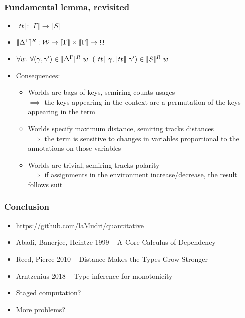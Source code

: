 \documentclass{beamer}
\begin{document}
  \begin{frame}
    \frametitle{Fundamental lemma, revisited}
    \begin{itemize}
    \item $\llbracket tt \rrbracket : \llbracket \Gamma \rrbracket \to
      \llbracket S \rrbracket$
    \item $\llbracket {\Delta}^{\Gamma} \rrbracket^R : \mathcal{W} \to
      \llbracket \Gamma \rrbracket \times \llbracket \Gamma \rrbracket \to \Omega$
    \item $\forall w.~\forall(\gamma, \gamma') \in \llbracket {\Delta}^{\Gamma}
      \rrbracket^R~w.~(\llbracket tt \rrbracket~\gamma, \llbracket tt
      \rrbracket~\gamma') \in \llbracket S \rrbracket^R~w$
    \item Consequences:
      \begin{itemize}
      \item Worlds are bags of keys, semiring counts usages \\
        $\implies$ the keys appearing in the context are a permutation of the
        keys appearing in the term
      \item Worlds specify maximum distance, semiring tracks distances \\
        $\implies$ the term is sensitive to changes in variables proportional to
        the annotations on those variables
      \item Worlds are trivial, semiring tracks polarity \\
        $\implies$ if assignments in the environment increase/decrease, the
        result follows suit
      \end{itemize}
    \end{itemize}
  \end{frame}
  \begin{frame}
    \frametitle{Conclusion}
    \begin{itemize}
    \item \url{https://github.com/laMudri/quantitative} \pause
    \item Abadi, Banerjee, Heintze 1999 -- A Core Calculus of Dependency
    \item Reed, Pierce 2010 -- Distance Makes the Types Grow Stronger
    \item Arntzenius 2018 -- Type inference for monotonicity \pause
    \item Staged computation?
    \item More problems?
    \end{itemize}
  \end{frame}
\end{document}
